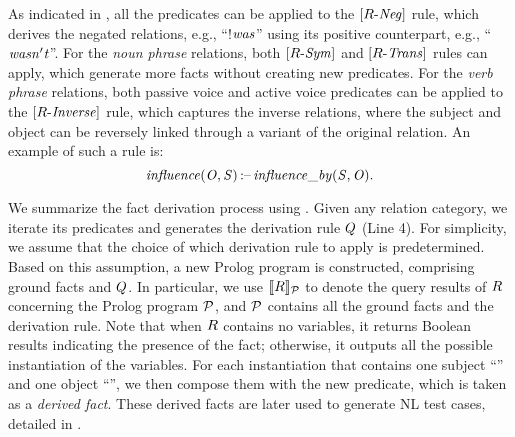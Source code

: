 As indicated in , 
all the predicates can be applied to the $[R\text{-}\mathit{Neg}]$ rule, which derives the negated relations, e.g., ``!$\mathit{was}$'' using its positive counterpart, e.g., ``$\mathit{wasn't}$''. 
For the \emph{noun phrase} relations, both $[R\text{-}\mathit{Sym}]$ and $[R\text{-}\mathit{Trans}]$ rules can apply, which generate more facts without creating new predicates. 
For the \emph{verb phrase} relations, both passive voice and active voice predicates can be applied to the  $[R\text{-}\mathit{Inverse}]$ rule, which captures the inverse relations, where the subject and object can be reversely linked through a variant of the original relation.  An example of such a rule is: 
\[
\mathit{influence(O, S)}\,\text{:--}\,\mathit{influence\_by(S, O)}
.\] 


We summarize the fact derivation process using . Given any relation category, we iterate its predicates and generates the derivation rule $Q$ (Line 4). 
For simplicity, we assume that the choice of which derivation rule to apply is predetermined. Based on this assumption, a new Prolog program is constructed, comprising ground facts and $Q$. 
In particular, we use $\llbracket R \rrbracket_{\mathcal{P}}$ to denote the query results of $R$ concerning the Prolog program $\mathcal{P}$, and $\mathcal{P}$ contains all the ground facts and the derivation rule. 
{Note that when $R$ contains no variables, it returns Boolean results indicating the presence of the fact; otherwise, it outputs all the possible instantiation of the variables. }
For each instantiation that contains one subject ``\Subj'' and one object ``\Obj'', we then compose them with the new predicate, which is taken as a  \emph{derived fact}.  
These derived facts are later used to generate NL test cases, detailed in . 


